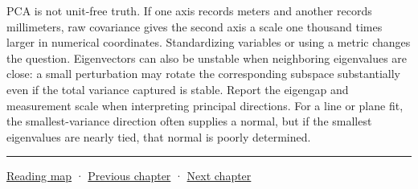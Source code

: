 PCA is not unit-free truth. If one axis records meters and another records millimeters, raw covariance gives the second axis a scale one thousand times larger in numerical coordinates. Standardizing variables or using a metric changes the question. Eigenvectors can also be unstable when neighboring eigenvalues are close: a small perturbation may rotate the corresponding subspace substantially even if the total variance captured is stable. Report the eigengap and measurement scale when interpreting principal directions. For a line or plane fit, the smallest-variance direction often supplies a normal, but if the smallest eigenvalues are nearly tied, that normal is poorly determined.

\begin{center}\rule{0.5\linewidth}{0.5pt}\end{center}

\href{Chapter\%20Edition/01\%20-\%20Computing\%20Foundations/00\%20-\%20Reading\%20Map}{Reading map} · \hyperref[02-foundations-ii-ch021]{Previous chapter} · \hyperref[02-foundations-ii-ch023]{Next chapter}
